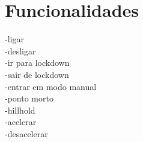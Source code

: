 
\section{Funcionalidades}
\label{sec:funcionalidades}

-ligar\\
-desligar\\
-ir para lockdown\\
-sair de lockdown\\
-entrar em modo manual\\
-ponto morto\\
-hillhold\\
-acelerar\\
-desacelerar\\


